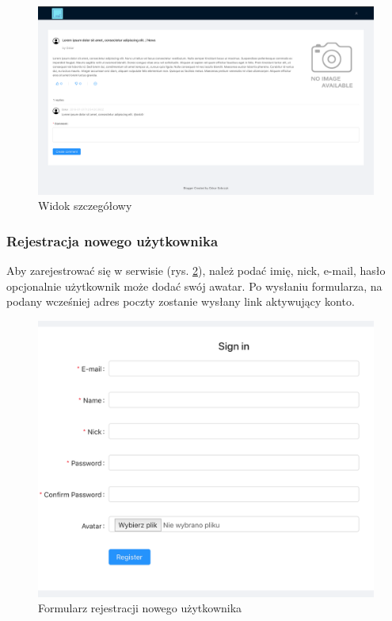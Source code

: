 \documentclass[declaration,shortabstract]{iithesis}
\begin{document}
\begin{figure}
    \centering
    \includegraphics[width=\textwidth]{images/widok_postu.png}
    \caption{Widok szczegółowy}
    \label{fig:post_view}
\end{figure}

\subsubsection{Rejestracja nowego użytkownika}
Aby zarejestrować się w serwisie (rys. \ref{fig:register}), należ podać imię, nick, e-mail, hasło opcjonalnie użytkownik może dodać swój awatar. Po wysłaniu formularza, na podany wcześniej adres poczty zostanie wysłany link aktywujący konto.

\begin{figure}
    \centering
    \includegraphics[width=\textwidth]{images/rejestracja.png}
    \caption{Formularz rejestracji nowego użytkownika}
    \label{fig:register}
\end{figure}
\end{document}

